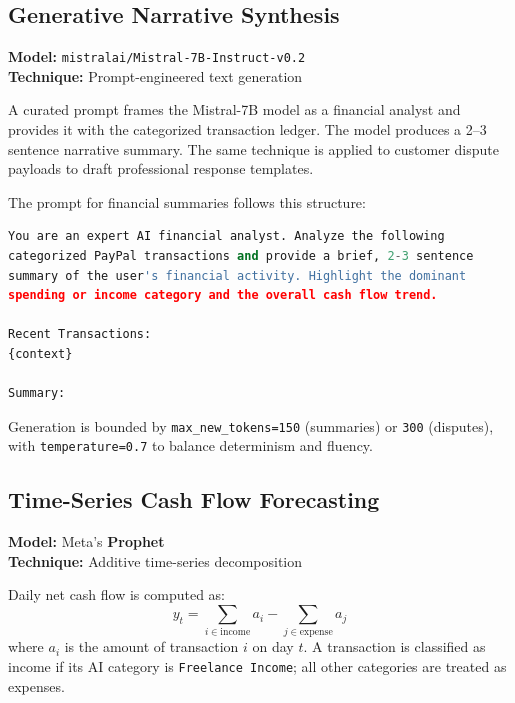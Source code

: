 \documentclass[11pt,a4paper]{article}
\begin{document}
\subsection{Generative Narrative Synthesis}
\label{subsec:generative}

\textbf{Model:} \texttt{mistralai/Mistral-7B-Instruct-v0.2} \\
\textbf{Technique:} Prompt-engineered text generation

A curated prompt frames the Mistral-7B model as a financial analyst and provides it with the categorized transaction ledger. The model produces a 2--3 sentence narrative summary. The same technique is applied to customer dispute payloads to draft professional response templates.

The prompt for financial summaries follows this structure:

\begin{lstlisting}[language=Python,caption={Prompt template for financial summary generation.}]
You are an expert AI financial analyst. Analyze the following
categorized PayPal transactions and provide a brief, 2-3 sentence
summary of the user's financial activity. Highlight the dominant
spending or income category and the overall cash flow trend.

Recent Transactions:
{context}

Summary:
\end{lstlisting}

Generation is bounded by \texttt{max\_new\_tokens=150} (summaries) or \texttt{300} (disputes), with \texttt{temperature=0.7} to balance determinism and fluency.

\subsection{Time-Series Cash Flow Forecasting}
\label{subsec:forecasting}

\textbf{Model:} Meta's \textbf{Prophet} \cite{taylor2018forecasting} \\
\textbf{Technique:} Additive time-series decomposition

Daily net cash flow is computed as:
\begin{equation}
  y_t = \sum_{i \in \text{income}} a_i - \sum_{j \in \text{expense}} a_j
\end{equation}
where $a_i$ is the amount of transaction $i$ on day $t$. A transaction is classified as income if its AI category is \texttt{Freelance Income}; all other categories are treated as expenses.
\end{document}
